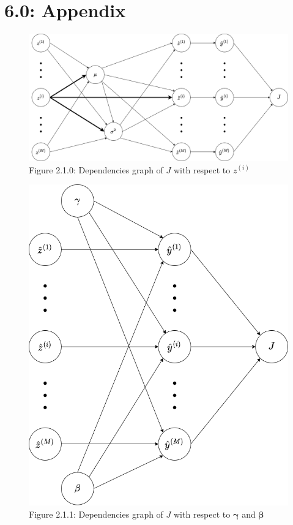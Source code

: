 \documentclass{article}
\begin{document}
\section*{6.0: Appendix}
\begin{figure}[!ht]
    \captionsetup{labelformat=empty}
    \centering
    \includegraphics[scale=0.4]{Batch Norm dependencies graph.drawio.png}
    \caption{Figure 2.1.0: Dependencies graph of $J$ with respect to $z^{(i)}$}
\end{figure}
\begin{figure}[!ht]
    \captionsetup{labelformat=empty}
    \centering
    \includegraphics[scale=0.4]{Dependencies graph with beta gamma.drawio.png}
    \caption{Figure 2.1.1: Dependencies graph of $J$ with respect to $\boldsymbol{\gamma}$ and $\boldsymbol{\beta}$}  
\end{figure}
\end{document}
